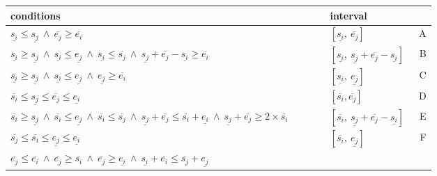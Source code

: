 \documentclass{llncs}
\begin{document}
 \iffalse
$
\underline{s_i}
\overline{s_i}
\underline{e_i}
\overline{e_i}
\underline{s_j}
\overline{s_j}
\underline{e_j}
\overline{e_j}
\myWedge
$
\fi
\newcommand\myLe{\!\le\!}
\newcommand\myGe{\!\ge\!}
\newcommand\myWedge{~\wedge~}
\newcommand\myPlus{\!+\!}
\newcommand\myMoins{\!-\!}
{
\begin{table}[!ht]
\vspace{-1.0cm}
\begin{minipage}{\textwidth}
\centering
{}
\begin{tabular}{|lll|r|}\cline{1-3}
\linespread{0.8}
\scriptsize
conditions &~~~~& interval \\ \hline
\scriptsize
$\underline{s_i} \myLe \underline{s_j} \myWedge  \overline{e_j} \myGe \overline{e_i}$
&&   $[\underline{s_i},~ \overline{e_j}]$ & ~A\\
\scriptsize
$\underline{s_i} \myGe \underline{s_j} \myWedge 
  \underline{s_i} \myLe \underline{e_j} \myWedge 
  \underline{s_i} \myLe \overline{s_j}  \myWedge
  \underline{s_j} \myPlus \overline{e_j} \myMoins \underline{s_i} \myGe \overline{e_i}$
&&   $[ \underline{s_i}   ,~   \underline{s_j} \myPlus \overline{e_j} \myMoins \underline{s_i}]$& B\\
\scriptsize
$\underline{s_i} \myGe \underline{s_j} \myWedge 
  \underline{s_i} \myLe \underline{e_j} \myWedge 
  \underline{e_j} \myGe  \overline{e_i}$
&& $[ \underline{s_i}   ,~   \underline{e_j}]$& C\\
\scriptsize
$\overline{s_i} \myLe \underline{s_j} \myLe \overline{e_j} \myLe \underline{e_i}  $
&&$[ \overline{s_i}   ,  \overline{e_j}]$ &D\\
\scriptsize
$\overline{s_i} \myGe \underline{s_j} \myWedge 
\overline{s_i} \myLe \underline{e_j} \myWedge 
\overline{s_i} \myLe \overline{s_j}  \myWedge
\underline{s_j} \myPlus \overline{e_j} \myLe \overline{s_i} \myPlus \underline{e_i} \myWedge
\underline{s_j} \myPlus \overline{e_j} \myGe 2 \times \overline{s_i}$
&& $[ \overline{s_i}   ,~   \underline{s_j}\myPlus \overline{e_j} \myMoins \underline{s_i} ]$& E\\
\scriptsize
$\overline{s_j} \myLe \overline{s_i} \myLe \underline{e_j} \myLe \underline{e_i}$
&& $[ \overline{s_i}   ,~   \underline{e_j}]$ &F\\
\scriptsize
$\overline{e_j} \myLe \overline{e_i} \myWedge
\overline{e_j} \myGe \overline{s_i} \myWedge
\overline{e_j} \myGe \underline{e_i} \myWedge
\underline{s_i} \myPlus \overline{e_i} \myLe \overline{s_j} \myPlus \underline{e_j}$

\end{tabular}
\end{minipage}
\end{table}}
\end{document}
